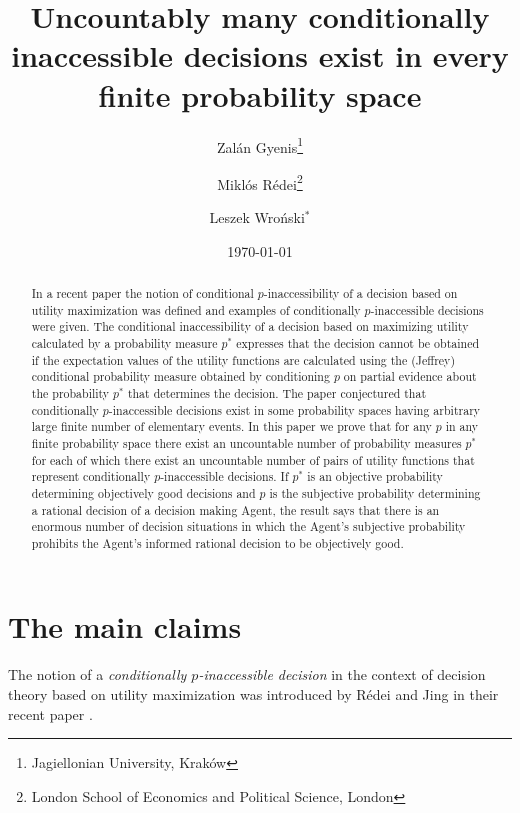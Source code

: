 \documentclass[10pt, letterpaper]{article}%
\title{Uncountably many conditionally inaccessible decisions exist in every finite probability space}
\author{Zal\'an Gyenis\thanks{Jagiellonian University, Krak\'ow}\and Mikl\'os R\'edei\thanks{London School of Economics and Political Science, London}\and Leszek Wro\'nski${}^{*}$}
\date{\today}
\theoremstyle{definition}
\newcommand{\1}{\mathbf 1}
\begin{document}
\maketitle

\begin{abstract}
In a recent paper \cite{Redei-Jing2026} the notion of conditional $p$-inaccessibility of a decision based on utility maximization was defined and examples of conditionally $p$-inaccessible decisions were given. 
The conditional inaccessibility of a decision based on maximizing utility calculated by a probability measure $p^*$ expresses that the decision cannot be obtained if the expectation values of the utility functions are calculated using the (Jeffrey) conditional probability measure obtained by conditioning $p$ on partial evidence about the probability $p^*$ that determines the decision. The paper \cite{Redei-Jing2026} conjectured that conditionally $p$-inaccessible decisions exist in some probability spaces having arbitrary large finite number of elementary events. In this paper we prove that for any $p$ in any finite probability space there exist an uncountable number of probability measures $p^*$ for each of which there exist an uncountable number of pairs of utility functions that represent conditionally $p$-inaccessible decisions. If $p^*$ is an objective probability determining objectively good decisions and $p$ is the subjective probability determining a rational decision of a decision making Agent, the result says that there is an enormous number of decision situations in which the Agent's subjective probability prohibits the Agent's informed rational decision to be objectively good.      
\end{abstract}

\section{The main claims}
The notion of a \emph{conditionally $p$-inaccessible decision} in the context of decision theory based on utility maximization was introduced by R\'edei and Jing in their recent paper \cite{Redei-Jing2026}. 
\end{document}
